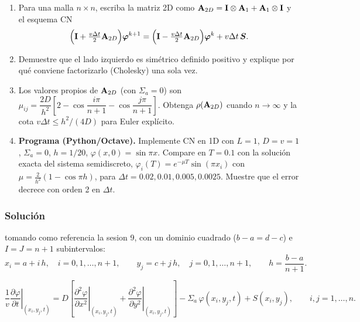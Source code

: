 
\begin{enunciado}
	\begin{enumerate}[label=(\alph*)]
		\item Para una malla $n\times n$, escriba la matriz 2D como
		$\mathbf{A}_{2D} = \mathbf{I}\otimes\mathbf{A}_1 + \mathbf{A}_1\otimes\mathbf{I}$ y el esquema CN
		\[
		\Big(\mathbf{I} + \tfrac{v\Delta t}{2}\mathbf{A}_{2D}\Big)\bm{\varphi}^{k+1}
		= \Big(\mathbf{I} - \tfrac{v\Delta t}{2}\mathbf{A}_{2D}\Big)\bm{\varphi}^{k} + v\Delta t\,\bm{S}.
		\]
		\item Demuestre que el lado izquierdo es simétrico definido positivo y explique por qué conviene
		factorizarlo (Cholesky) una sola vez.
		\item Los valores propios de $\mathbf{A}_{2D}$ (con $\Sigma_a = 0$) son
		$\mu_{ij} = \dfrac{2D}{h^2}\left[2 - \cos\dfrac{i\pi}{n+1} - \cos\dfrac{j\pi}{n+1}\right]$.
		Obtenga $\rho(\mathbf{A}_{2D})$ cuando $n\to\infty$ y la cota $v\Delta t \le h^2/(4D)$ para Euler explícito.
		\item \textbf{Programa (Python/Octave).} Implemente CN en 1D con $L = 1$, $D = v = 1$,
		$\Sigma_a = 0$, $h = 1/20$, $\varphi(x, 0) = \sin\pi x$. Compare en $T = 0.1$ con la solución
		exacta del sistema semidiscreto, $\varphi_i(T) = e^{-\mu T}\sin(\pi x_i)$ con
		$\mu = \frac{2}{h^2}(1 - \cos\pi h)$, para $\Delta t = 0.02, 0.01, 0.005, 0.0025$.
		Muestre que el error decrece con orden 2 en $\Delta t$.
	\end{enumerate}
\end{enunciado}


\subsubsection*{Solución}




tomando como referencia la sesion 9, con un dominio cuadrado ($b - a = d - c$) e $I = J = n+1$ subintervalos:
\[
x_i = a + i\,h,\quad i = 0, 1, \dots, n+1, \qquad
y_j = c + j\,h,\quad j = 0, 1, \dots, n+1, \qquad
h = \frac{b - a}{n+1}.
\]


\[
\frac1v\left.\frac{\partial\varphi}{\partial t}\right|_{(x_i, y_j, t)}
= D\left[\left.\frac{\partial^2\varphi}{\partial x^2}\right|_{(x_i, y_j, t)}
+ \left.\frac{\partial^2\varphi}{\partial y^2}\right|_{(x_i, y_j, t)}\right]
- \Sigma_a\,\varphi(x_i, y_j, t) + S(x_i, y_j),
\qquad i, j = 1, \dots, n .
\]

